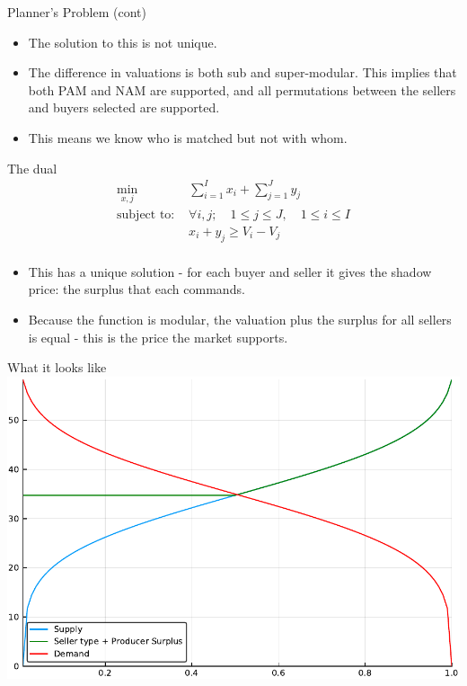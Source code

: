 \documentclass[bigger]{beamer}
\begin{document}
\begin{frame}[label=sec-1-5]{Planner's Problem (cont)}
\begin{itemize}
\item The solution to this is not unique.
\item The difference in valuations is both sub and super-modular. This
implies that both PAM and NAM are supported, and all permutations
between the sellers and buyers selected are supported.
\item This means we know who is matched but not with whom.
\end{itemize}
\end{frame}

\begin{frame}[label=sec-1-6]{The dual}
\begin{align*}
\min_{x,j} & \sum_{i=1}^I x_i + \sum_{j=1}^J y_j \\
\text{subject to: } & \forall i,j; \quad 1 \leq j \leq J, \quad 1 \le i \leq I\\
& x_i + y_j \geq V_i - V_j \\ 
\end{align*}

\begin{itemize}
\item This has a unique solution - for each buyer and seller it gives the
shadow price: the surplus that each commands.
\item Because the function is modular, the valuation plus the surplus for
all sellers is equal - this is the price the market supports.
\end{itemize}
\end{frame}

\begin{frame}[label=sec-1-7]{What it looks like}
\includegraphics[width=.9\linewidth]{../Scripts/evenStevens.pdf}
\end{frame}
\end{document}
